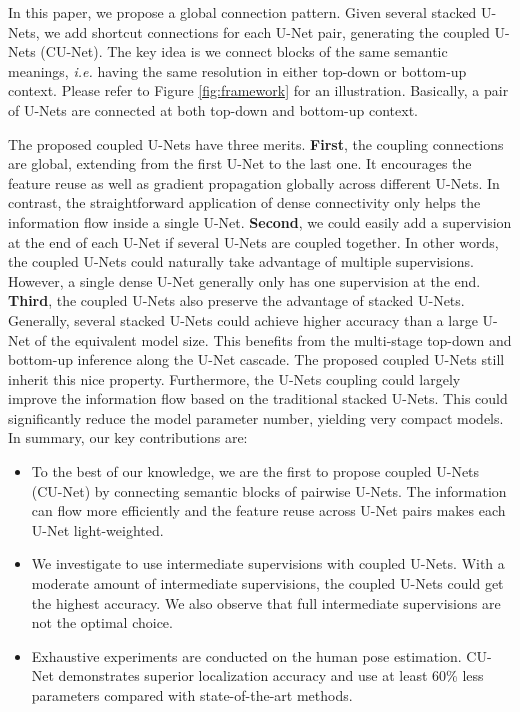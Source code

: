 \documentclass{bmvc2k}
\begin{document}
In this paper, we propose a global connection pattern. Given several stacked U-Nets, we add shortcut connections for each U-Net pair, generating the coupled U-Nets (CU-Net). The key idea is we connect blocks of the same semantic meanings, {\it i.e.} having the same resolution in either top-down or bottom-up context. Please refer to Figure \ref{fig:framework} for an illustration. Basically, a pair of U-Nets are connected at both top-down and bottom-up context.



The proposed coupled U-Nets have three merits. {\bf First}, the coupling connections are global, extending from the first U-Net to the last one. It encourages the feature reuse as well as gradient propagation globally across different U-Nets. In contrast, the straightforward application of dense connectivity only helps the information flow inside a single U-Net. {\bf Second}, we could easily add a supervision at the end of each U-Net if several U-Nets are coupled together. In other words, the coupled U-Nets could naturally take advantage of multiple supervisions. However, a single dense U-Net generally only has one supervision at the end. {\bf Third}, the coupled U-Nets also preserve the advantage of stacked U-Nets. Generally, several stacked U-Nets could achieve higher accuracy than a large U-Net of the equivalent model size. This benefits from the multi-stage top-down and bottom-up inference along the U-Net cascade. The proposed coupled U-Nets still inherit this nice property. Furthermore, the U-Nets coupling could largely improve the information flow based on the traditional stacked U-Nets. This could significantly reduce the model parameter number, yielding very compact models. In summary, our key contributions are:

\begin{itemize}
    \item To the best of our knowledge, we are the first to propose coupled U-Nets (CU-Net) by connecting semantic blocks of pairwise U-Nets. The information can flow more efficiently and the feature reuse across U-Net pairs makes each U-Net light-weighted.
    \item We investigate to use intermediate supervisions with coupled U-Nets. With a moderate amount of intermediate supervisions, the coupled U-Nets could get the highest accuracy. We also observe that full intermediate supervisions are not the optimal choice.
    \item Exhaustive experiments are conducted on the human pose estimation. CU-Net demonstrates superior localization accuracy and use at least 60\% less parameters compared with state-of-the-art methods.
\end{itemize}
\end{document}
